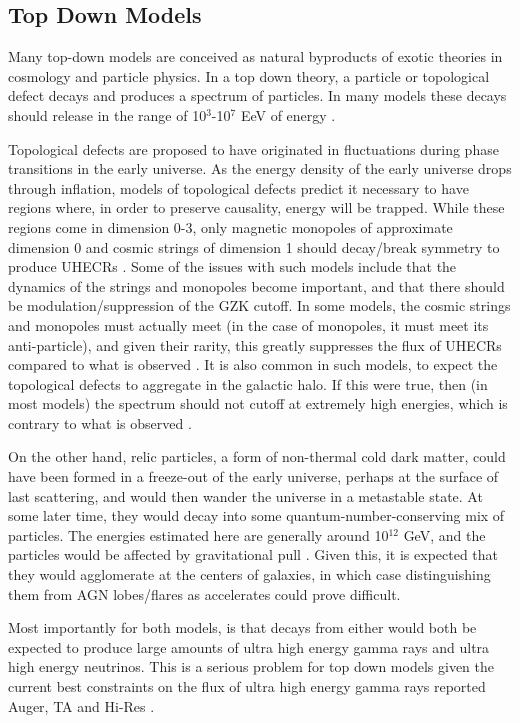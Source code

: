 \subsection{Top Down Models}%
Many top-down models are conceived as natural byproducts of exotic theories in cosmology and particle physics. In a top down theory, a particle or topological defect decays and produces a spectrum of particles. In many models these decays should release in the range of 10$^3$-10$^7$ EeV of energy \cite{stanev}. 

Topological defects are proposed to have originated in fluctuations during phase transitions in the early universe. As the energy density of the early universe drops through inflation, models of topological defects predict it necessary to have regions where, in order to preserve causality, energy will be trapped. While these regions come in dimension 0-3, only magnetic monopoles of approximate dimension 0 and cosmic strings of dimension 1 should decay/break symmetry to produce UHECRs \cite{stanev}. Some of the issues with such models include that the dynamics of the strings and monopoles become important, and that there should be modulation/suppression of the GZK cutoff. In some models, the cosmic strings and monopoles must actually meet (in the case of monopoles, it must meet its anti-particle), and given their rarity, this greatly suppresses the flux of UHECRs compared to what is observed \cite{tds}. It is also common in such models, to expect the topological defects to aggregate in the galactic halo. If this were true, then (in most models) the spectrum should not cutoff at extremely high energies, which is contrary to what is observed \cite{tds}.

On the other hand, relic particles, a form of non-thermal cold dark matter, could have been formed in a freeze-out of the early universe, perhaps at the surface of last scattering, and would then wander the universe in a metastable state. At some later time, they would decay into some quantum-number-conserving mix of particles. The energies estimated here are generally around 10$^{12}$ GeV, and the particles would be affected by gravitational pull \cite{tds,stanev}. Given this, it is expected that they would agglomerate at the centers of galaxies, in which case distinguishing them from AGN lobes/flares as accelerates could prove difficult. 

Most importantly for both models, is that decays from either would both be expected to produce large amounts of ultra high energy gamma rays and ultra high energy neutrinos. This is a serious problem for top down models given the current best constraints on the flux of ultra high energy gamma rays reported Auger, TA and Hi-Res \cite{futuregzk,foteini}. 
